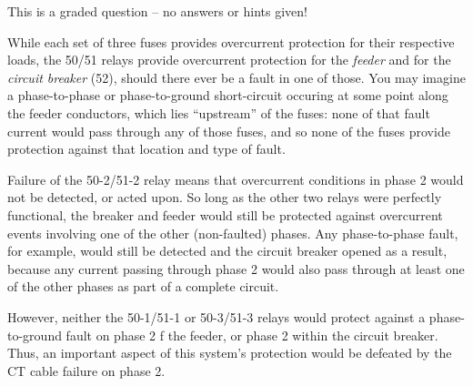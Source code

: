 
This is a graded question -- no answers or hints given!







While each set of three fuses provides overcurrent protection for their respective loads, the 50/51 relays provide overcurrent protection for the {\it feeder} and for the {\it circuit breaker} (52), should there ever be a fault in one of those.  You may imagine a phase-to-phase or phase-to-ground short-circuit occuring at some point along the feeder conductors, which lies ``upstream'' of the fuses: none of that fault current would pass through any of those fuses, and so none of the fuses provide protection against that location and type of fault.

\vskip 10pt

Failure of the 50-2/51-2 relay means that overcurrent conditions in phase 2 would not be detected, or acted upon.  So long as the other two relays were perfectly functional, the breaker and feeder would still be protected against overcurrent events involving one of the other (non-faulted) phases.  Any phase-to-phase fault, for example, would still be detected and the circuit breaker opened as a result, because any current passing through phase 2 would also pass through at least one of the other phases as part of a complete circuit.

However, neither the 50-1/51-1 or 50-3/51-3 relays would protect against a phase-to-ground fault on phase 2 f the feeder, or phase 2 within the circuit breaker.  Thus, an important aspect of this system's protection would be defeated by the CT cable failure on phase 2.




